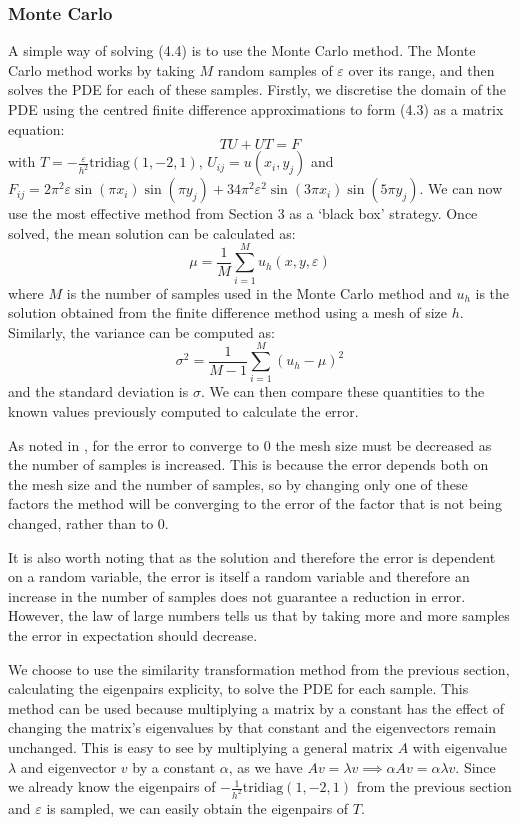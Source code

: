 \documentclass[11pt]{article}
\numberwithin{equation}{section}
\begin{document}
\subsubsection{Monte Carlo}
A simple way of solving (4.4) is to use the Monte Carlo method. The Monte Carlo method works by taking $M$ random samples of $\varepsilon$ over its range, and then solves the PDE for each of these samples. Firstly, we discretise the domain of the PDE using the centred finite difference approximations to form (4.3) as a matrix equation:
\begin{equation}
TU + UT = F
\end{equation}
with $T = -\frac{\varepsilon}{h^2} \text{tridiag}(1,-2,1)$, $U_{ij} = u(x_i, y_j)$ and $F_{ij} = 2\pi^2 \varepsilon \sin(\pi x_i) \sin(\pi y_j)+ 34 \pi^2 \varepsilon^2 \sin(3 \pi x_i) \sin(5 \pi y_j)$. We can now use the most effective method from Section 3 as a `black box' strategy. Once solved, the mean solution can be calculated as:
\begin{equation}
\mu = \frac{1}{M} \sum_{i=1}^M u_h (x, y, \varepsilon)
\end{equation}
where $M$ is the number of samples used in the Monte Carlo method and $u_h$ is the solution obtained from the finite difference method using a mesh of size $h$. Similarly, the variance can be computed as:
\begin{equation}
\sigma^2 = \frac{1}{M-1}\sum_{i=1}^M (u_h - \mu)^2
\end{equation}
and the standard deviation is $\sigma$. We can then compare these quantities to the known values previously computed to calculate the error.

As noted in \cite{Bishop}, for the error to converge to 0 the mesh size must be decreased as the number of samples is increased. This is because the error depends both on the mesh size and the number of samples, so by changing only one of these factors the method will be converging to the error of the factor that is not being changed, rather than to 0. 

It is also worth noting that as the solution and therefore the error is dependent on a random variable, the error is itself a random variable and therefore an increase in the number of samples does not guarantee a reduction in error. However, the law of large numbers tells us that by taking more and more samples the error in expectation should decrease.

We choose to use the similarity transformation method from the previous section, calculating the eigenpairs explicity, to solve the PDE for each sample. This method can be used because multiplying a matrix by a constant has the effect of changing the matrix's eigenvalues by that constant and the eigenvectors remain unchanged. This is easy to see by multiplying a general matrix $A$ with eigenvalue $\lambda$ and eigenvector $v$ by a constant $\alpha$, as we have $Av = \lambda v \implies \alpha A v = \alpha \lambda v$. Since we already know the eigenpairs of $-\frac{1}{h^2} \text{tridiag}(1,-2,1)$ from the previous section and $\varepsilon$ is sampled, we can easily obtain the eigenpairs of $T$. 
\end{document}
